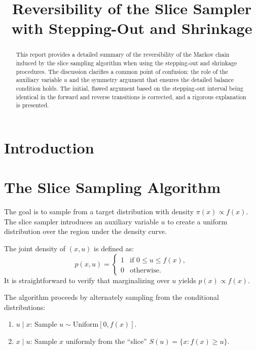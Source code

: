 \documentclass[12pt, oneside, paper=A4, DIV=15, BCOR=0mm, abstract=true, headings=small]{scrartcl}
\title{Reversibility of the Slice Sampler \\ with Stepping-Out and Shrinkage}
\date{}
\author{}
\theoremstyle{customdef}
\begin{document}
\maketitle

\begin{abstract}
	\noindent
This report provides a detailed summary of the reversibility of the Markov chain induced by the slice sampling algorithm when using the stepping-out and shrinkage procedures. The discussion clarifies a common point of confusion: the role of the auxiliary variable \( u \) and the symmetry argument that ensures the detailed balance condition holds. The initial, flawed argument based on the stepping-out interval being identical in the forward and reverse transitions is corrected, and a rigorous explanation is presented.
\end{abstract}

\section{Introduction}

\section{The Slice Sampling Algorithm}
The goal is to sample from a target distribution with density \( \pi(x) \propto f(x) \). The slice sampler introduces an auxiliary variable \( u \) to create a uniform distribution over the region under the density curve.

\begin{definition}
The joint density of \( (x, u) \) is defined as:
\[
p(x, u) =
\begin{cases}
1 & \text{if } 0 \le u \le f(x), \\
0 & \text{otherwise}.
\end{cases}
\]
It is straightforward to verify that marginalizing over \( u \) yields \( p(x) \propto f(x) \).
\end{definition}

The algorithm proceeds by alternately sampling from the conditional distributions:
\begin{enumerate}
    \item \( u \mid x \): Sample \( u \sim \text{Uniform}[0, f(x)] \).
    \item \( x \mid u \): Sample \( x \) uniformly from the ``slice'' \( S(u) = \{ x : f(x) \ge u \} \).
\end{enumerate}
\end{document}
